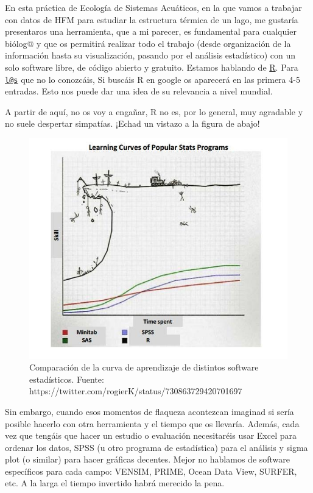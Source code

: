 \documentclass[
]{book}
\begin{document}
En esta práctica de Ecología de Sistemas Acuáticos, en la que vamos a trabajar con datos de HFM para estudiar la estructura térmica de un lago, me gustaría presentaros una herramienta, que a mi parecer, es fundamental para cualquier biólog@ y que os permitirá realizar todo el trabajo (desde organización de la información hasta su visualización, pasando por el análisis estadístico) con un solo software libre, de código abierto y gratuito. Estamos hablando de \href{https://www.r-project.org/}{R}. Para \href{mailto:l@s}{\nolinkurl{l@s}} que no lo conozcáis, Si buscáis R en google os aparecerá en las primera 4-5 entradas. Esto nos puede dar una idea de su relevancia a nivel mundial.

A partir de aquí, no os voy a engañar, R no es, por lo general, muy agradable y no suele despertar simpatías. ¡Echad un vistazo a la figura de abajo!

\begin{figure}

{\centering \includegraphics[width=1\linewidth]{Img/Learn_R} 

}

\caption{Comparación de la curva de aprendizaje de distintos software estadísticos. Fuente: https://twitter.com/rogierK/status/730863729420701697}\label{fig:unnamed-chunk-2}
\end{figure}

Sin embargo, cuando esos momentos de flaqueza acontezcan imaginad si sería posible hacerlo con otra herramienta y el tiempo que os llevaría. Además, cada vez que tengáis que hacer un estudio o evaluación necesitaréis usar Excel para ordenar los datos, SPSS (u otro programa de estadística) para el análisis y sigma plot (o similar) para hacer gráficas decentes. Mejor no hablamos de software específicos para cada campo: VENSIM, PRIME, Ocean Data View, SURFER, etc. A la larga el tiempo invertido habrá merecido la pena.
\end{document}
